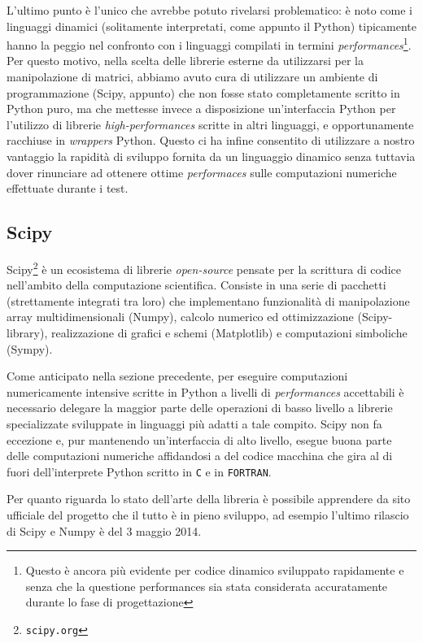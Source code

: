 \documentclass[11pt,a4paper]{scrartcl}
\begin{document}
L'ultimo punto è l'unico che avrebbe potuto rivelarsi problematico: è noto come i linguaggi dinamici (solitamente interpretati, come appunto il Python) tipicamente hanno la peggio nel confronto con i linguaggi compilati in termini \emph{performances}\footnote{Questo è ancora più evidente per codice dinamico sviluppato rapidamente e senza che la questione performances sia stata considerata accuratamente durante lo fase di progettazione}. Per questo motivo, nella scelta delle librerie esterne da utilizzarsi per la manipolazione di matrici, abbiamo avuto cura di utilizzare un ambiente di programmazione (Scipy, appunto) che non fosse stato completamente scritto in Python puro, ma che mettesse invece a disposizione un'interfaccia Python per l'utilizzo di librerie \emph{high-performances} scritte in altri linguaggi, e opportunamente racchiuse in \emph{wrappers} Python. Questo ci ha infine consentito di utilizzare a nostro vantaggio la rapidità di sviluppo fornita da un linguaggio dinamico senza tuttavia dover rinunciare ad ottenere ottime \emph{performaces} sulle computazioni numeriche effettuate durante i test.


\subsection*{Scipy}
Scipy\footnote{\texttt{scipy.org}} è un ecosistema di librerie \emph{open-source} pensate per la scrittura di codice nell'ambito della computazione scientifica. Consiste in una serie di pacchetti (strettamente integrati tra loro) che implementano funzionalità di manipolazione array multidimensionali (Numpy), calcolo numerico ed ottimizzazione (Scipy-library), realizzazione di grafici e schemi (Matplotlib) e computazioni simboliche (Sympy).

Come anticipato nella sezione precedente, per eseguire computazioni numericamente intensive scritte in Python a livelli di \emph{performances} accettabili è necessario delegare la maggior parte delle operazioni di basso livello a librerie specializzate sviluppate in linguaggi più adatti a tale compito. Scipy non fa eccezione e, pur mantenendo un'interfaccia di alto livello, esegue buona parte delle computazioni numeriche affidandosi a del codice macchina che gira al di fuori dell'interprete Python scritto in \texttt{C} e in \texttt{FORTRAN}. 

Per quanto riguarda lo stato dell'arte della libreria è possibile apprendere da sito ufficiale del progetto che il tutto è in pieno sviluppo, ad esempio l'ultimo rilascio di Scipy e Numpy è del 3 maggio 2014.
\end{document}
